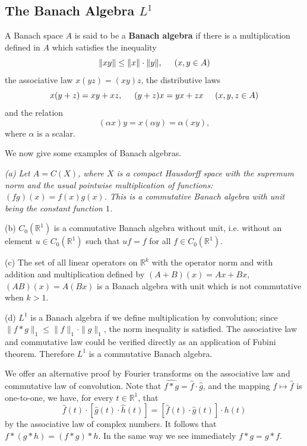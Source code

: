 \subsection{The Banach Algebra $L^1$}
A Banach space $A$ is said to be a \textbf{Banach algebra} if there is a multiplication defined in $A$ which satisfies the inequality 
$$\|xy\|\le\|x\|\cdot\|y\|,\hspace{0.5cm}(x,y\in A)$$
the associative law $x(yz)=(xy)z$, the distributive laws 
$$x(y+z)=xy+xz,\hspace{0.5cm}(y+z)x=yx+zx\hspace{0.5cm}(x,y,z\in A)$$
and the relation 
$$(\alpha x)y=x(\alpha y)=\alpha(xy),$$
where $\alpha$ is a scalar.\par
We now give some examples of Banach algebras.
\begin{example}\em
(a) Let $A=C(X)$, where $X$ is a compact Hausdorff space with the supremum norm and the usual pointwise multiplication of functions: $(fg)(x)=f(x)g(x)$. This is a commutative Banach algebra with unit being the constant function $1$.\par
(b) $C_0(\mathbb{R}^1)$ is a commutative Banach algebra without unit, i.e. without an element $u\in C_0(\mathbb{R}^1)$ such that $uf=f$ for all $f\in C_0(\mathbb{R}^1)$.\par
(c) The set of all linear operators on $\mathbb{R}^k$ with the operator norm and with addition and multiplication defined by $(A+B)(x)=Ax+Bx$, $(AB)(x)=A(Bx)$ is a Banach algebra with unit which is not commutative when $k>1$.\par
(d) $L^1$ is a Banach algebra if we define multiplication by convolution; since $\|f*g\|_1\le\|f\|_1\cdot\|g\|_1$, the norm inequality is satisfied. The associative law and commutative law could be verified directly as an application of Fubini theorem. Therefore $L^1$ is a commutative Banach algebra.
\end{example}
We offer an alternative proof by Fourier transforms on the associative law and commutative law of convolution. Note that $\widehat{f*g}=\widehat{f}\cdot\widehat{g}$, and the mapping $f\mapsto\widehat{f}$ is one-to-one, we have, for every $t\in\mathbb{R}^1$, that 
$$
\widehat{f}\left( t \right) \cdot \left[ \widehat{g}\left( t \right) \cdot \widehat{h}\left( t \right) \right] =\left[ \widehat{f}\left( t \right) \cdot \widehat{g}\left( t \right) \right] \cdot h\left( t \right) 
$$
by the associative law of complex numbers. It follows that $f*(g*h)=(f*g)*h$. In the same way we see immediately $f*g=g*f$.\par
